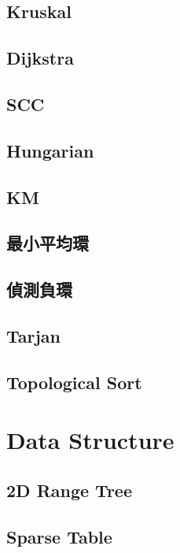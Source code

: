 \subsection{Kruskal}

\subsection{Dijkstra}

\subsection{SCC}

\subsection{Hungarian}

\subsection{KM}

\subsection{最小平均環}

\subsection{偵測負環}

\subsection{Tarjan}

\subsection{Topological Sort}


\section{Data Structure}

\subsection{2D Range Tree}

\subsection{Sparse Table}

